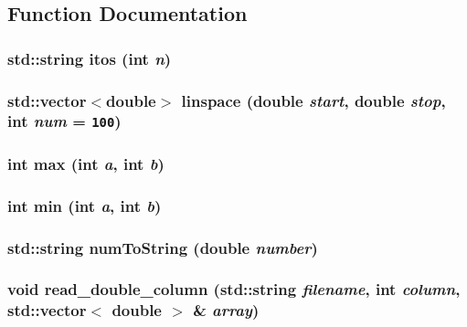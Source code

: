 \subsection{Function Documentation}
\subsubsection{\setlength{\rightskip}{0pt plus 5cm}std::string itos (int {\em n})}\label{misc_8h_5bdcfae08119c4a7fe8ad391584d4e89}


\subsubsection{\setlength{\rightskip}{0pt plus 5cm}std::vector$<$double$>$ linspace (double {\em start}, double {\em stop}, int {\em num} = {\tt 100})}\label{misc_8h_4a72af61a51276042a07a3b425ee4ac2}


\subsubsection{\setlength{\rightskip}{0pt plus 5cm}int max (int {\em a}, int {\em b})}\label{misc_8h_a1460da02198e3866d1ce23f0e25daff}


\subsubsection{\setlength{\rightskip}{0pt plus 5cm}int min (int {\em a}, int {\em b})}\label{misc_8h_3d94da36be4b94a90216d89313f1a28b}


\subsubsection{\setlength{\rightskip}{0pt plus 5cm}std::string num\-To\-String (double {\em number})}\label{misc_8h_be893c15d04d9b74b59a1023727aa99b}


\subsubsection{\setlength{\rightskip}{0pt plus 5cm}void read\_\-double\_\-column (std::string {\em filename}, int {\em column}, std::vector$<$ double $>$ \& {\em array})}\label{misc_8h_aa78539eee0bf5b1257992625e626523}


